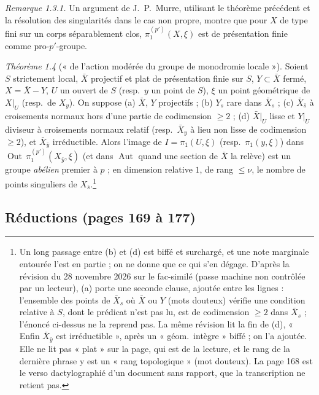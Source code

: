 \documentclass[11pt,a4paper]{article}
\begin{document}
\emph{Remarque 1.3.1.} Un argument de J.\ P.\ Murre, utilisant le théorème
précédent et la résolution des singularités dans le cas non propre, montre que
pour $X$ de type fini sur un corps séparablement clos, $\pi_1^{(p')}(X, \xi)$ est
de présentation finie comme pro-$p'$-groupe.

\emph{Théorème 1.4} (« de l'action modérée du groupe de monodromie locale »). Soient
$S$ strictement local, $\bar X$ projectif et plat de présentation finie sur $S$,
$Y \subset \bar X$ fermé, $X = \bar X - Y$, $U$ un ouvert de $S$ (resp.\ $y$ un
point de $S$), $\xi$ un point géométrique de $X|_U$ (resp.\ de $X_y$). On suppose
(a) $\bar X$, $Y$ projectifs ; (b) $Y_s$ rare dans $\bar X_s$ ; (c)
$\bar X_{\bar s}$ à croisements normaux hors d'une partie de codimension $\geq 2$ ;
(d) $\bar X|_U$ lisse et $Y|_U$ diviseur à croisements normaux relatif (resp.\
$\bar X_y$ à lieu non lisse de codimension $\geq 2$), et $\bar X_{\bar y}$
irréductible. Alors l'image de
$I = \pi_1(U, \xi)$ (resp.\ $\pi_1(y, \xi)$) dans $\operatorname{Out}\,
\pi_1^{(p')}(X_{\bar y}, \xi)$ (et dans $\operatorname{Aut}$ quand une section
de $\bar X$ la relève) est un groupe \emph{abélien} premier à $p$ ; en dimension
relative $1$, de rang $\leq \nu$, le nombre de points singuliers de
$X_{\bar s}$.\footnote{Un long passage entre (b) et (d) est biffé et surchargé, et
une note marginale entourée l'est en partie ; on ne donne que ce qui s'en
dégage. D'après la révision du 28 novembre 2026 sur le fac-similé (passe
machine non contrôlée par un lecteur), (a) porte une seconde clause, ajoutée
entre les lignes : l'ensemble des points de $\bar X_s$ où $\bar X$ ou $Y$
(mots douteux) vérifie une condition relative à $S$, dont le prédicat n'est pas
lu, est de codimension $\geq 2$ dans $\bar X_s$ ; l'énoncé ci-dessus ne la
reprend pas. La même révision lit la fin de (d), « Enfin $\bar X_{\bar y}$ est
irréductible », après un « géom.\ intègre » biffé ; on l'a ajoutée. Elle ne lit
pas « plat » sur la page, qui est de la lecture, et le rang de la dernière
phrase y est un « rang topologique » (mot douteux). La page 168 est le verso dactylographié d'un document sans rapport, que
la transcription ne retient pas.}

\subsection*{Réductions (pages 169 à 177)}
\end{document}
